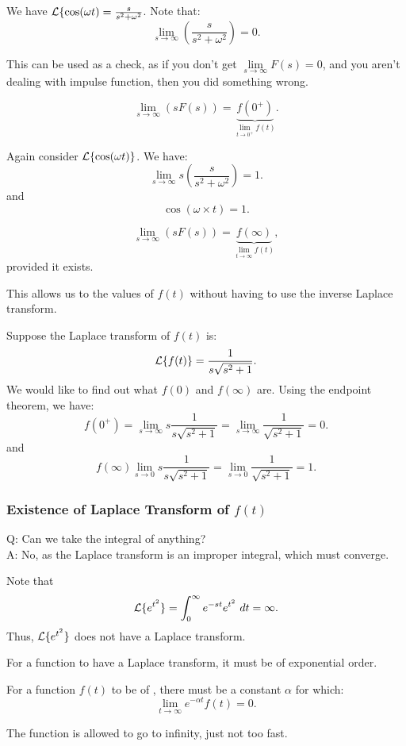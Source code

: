 \documentclass[../main/main.tex]{subfiles}
\begin{document}
\begin{example}
	We have $\mathcal{L}\{\cos(\omega t)= \frac{s}{s^2+\omega^2}$. Note that: \[
			\lim\limits_{s \to \infty} \left( \frac{s}{s^2+\omega^2} \right) =0
	.\] 
\end{example}
\begin{remark}
	This can be used as a check, as if you don't get $\lim\limits_{s \to \infty} F(s)=0$, and you aren't dealing with impulse function, then you did something wrong. 
\end{remark}
\begin{theorem} 
	\[
		\lim\limits_{s \to \infty} (sF(s))=\underbrace{f(0^{+})}_{\lim\limits_{t \to 0^+} f(t)}
	.\]
\end{theorem}
\begin{example}
	Again consider $\mathcal{L}\{\cos(\omega t)\}$. We have: \[
		\lim\limits_{s \to \infty} s\left( \frac{s}{s^2+\omega^2} \right) =1
	.\] and \[
	\cos(\omega \times t) = 1
	.\] 
\end{example}

\begin{theorem}
	 \[
		 \lim\limits_{s \to \infty} (sF(s)) = \underbrace{f(\infty)}_{\lim\limits_{t \to \infty} f(t)}
	,\] provided it exists. 
\end{theorem}
\begin{remark}
	This allows us to the values of $f(t)$ without having to use the inverse Laplace transform.
\end{remark}
\begin{example}
	Suppose the Laplace transform of $f(t)$ is:  \[
		\mathcal{L}\{f(t)\} = \frac{1}{s\sqrt{s^2+1} }
	.\] We would like to find out what $f(0)$ and $f(\infty)$ are. Using the endpoint theorem, we have: \[
	f(0^{+}) = \lim\limits_{s \to \infty} s \frac{1}{s\sqrt{s^2+1} } = \lim\limits_{s \to \infty}  \frac{1}{\sqrt{s^2+1} } = 0
	.\] and \[
	f(\infty) \lim\limits_{s \to 0} s \frac{1}{s\sqrt{s^2+1} } = \lim\limits_{s \to 0} \frac{1}{\sqrt{s^2+1} }=1
	.\] 
\end{example}
\subsubsection{Existence of Laplace Transform of $f(t)$}
	Q: Can we take the integral of anything?\\
	A: No, as the Laplace transform is an improper integral, which must converge. 
	\begin{example}
		Note that  \[
			\mathcal{L}\{e^{t^2}\}=\int^\infty_0e^{-st}e^{t^2}~dt = \infty
		.\] Thus, $\mathcal{L}\{e^{t^2}\}$ does not have a Laplace transform.
	\end{example}
For a function to have a Laplace transform, it must be of exponential order.
\begin{definition} 
	For a function $f(t)$ to be of , there must be a constant $\alpha$ for which: \[
		\lim\limits_{t \to \infty} e^{-\alpha t}f(t) = 0
	.\] 
\end{definition}
The function is allowed to go to infinity, just not too fast.
\end{document}
